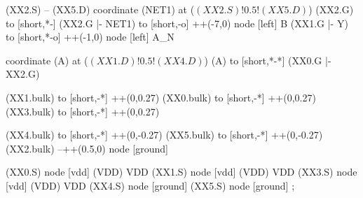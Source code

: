 \begin{circuitikz}[american]
	(XX2.S) -- (XX5.D)
	coordinate (NET1) at ($(XX2.S)!0.5!(XX5.D)$)
	(XX2.G) to [short,*-] (XX2.G |- NET1) to [short,-o] ++(-7,0) node [left] {B}
	(XX1.G |- Y) to [short,*-o] ++(-1,0) node [left] {A\_N}
	
	coordinate (A) at ($(XX1.D)!0.5!(XX4.D)$)
	(A) to [short,*-*] (XX0.G |- XX2.G)
	
	(XX1.bulk) to [short,-*] ++(0,0.27)
	(XX0.bulk) to [short,-*] ++(0,0.27)
	(XX3.bulk) to [short,-*] ++(0,0.27)
	
	(XX4.bulk) to [short,-*] ++(0,-0.27)
	(XX5.bulk) to [short,-*] ++(0,-0.27)
	(XX2.bulk) --++(0.5,0) node [ground] {}


	(XX0.S) node [vdd] (VDD) {VDD}
	(XX1.S) node [vdd] (VDD) {VDD}
	(XX3.S) node [vdd] (VDD) {VDD}
	(XX4.S) node [ground] {}
	(XX5.S) node [ground] {}
;

\end{circuitikz}
